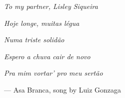 \vspace*{\fill}
\begin{flushright}
\emph{To my partner, Lisley Siqueira}
\end{flushright}
\vspace*{\fill}


\vspace*{\fill}

\begin{flushright}
    \emph{Hoje longe, muitas l\'egua}

    \emph{Numa triste solid\~ao}

    \emph{Espero a chuva cair de novo}

    \emph{Pra mim vortar' pro meu sert\~ao}

    --- Asa Branca, song by Luiz Gonzaga
\end{flushright}
\vspace*{\fill}

\cleardoublepage